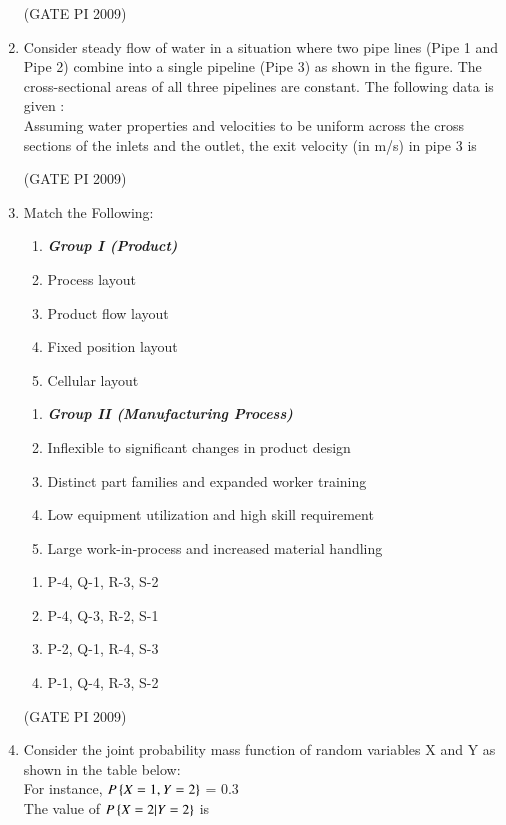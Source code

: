 \documentclass[journal,12pt,onecolumn]{IEEEtran}
\theoremstyle{remark}
\begin{document}
\begin{enumerate}
\hfill (GATE PI 2009)
\item Consider steady flow of water in a situation where two pipe lines (Pipe 1 and Pipe 2) combine into a single pipeline (Pipe 3) as shown in the figure. The cross-sectional areas of all three pipelines are constant. The following data is given : \\
$$$$
Assuming water properties and velocities to be uniform across the cross sections of the inlets and the outlet, the exit velocity (in m/s) in pipe 3 is
\begin{enumerate}
\end{enumerate}
\hfill (GATE PI 2009)

\item Match the Following:
{
\setlength{\columnsep}{-5cm}
\begin{multicols}{2}
\begin{enumerate}[label=\Alph*.]
    \item[]  \textit{\textbf{Group I (Product)}}
    \item Process layout
    \item Product flow layout
    \item Fixed position layout
    \item Cellular layout 
\end{enumerate}
\columnbreak
\begin{enumerate}[label=\arabic*.]
    \item[] \textit{\textbf{Group II (Manufacturing Process)}}
    \item Inflexible to significant changes in product design
    \item Distinct part families and expanded worker training
    \item Low equipment utilization and high skill requirement
    \item Large work-in-process and increased material handling
\end{enumerate}
\end{multicols}
}
\begin{multicols}{2}
\begin{enumerate}
    \item P-4, Q-1, R-3, S-2
    \item P-4, Q-3, R-2, S-1
    \item P-2, Q-1, R-4, S-3
    \item P-1, Q-4, R-3, S-2
\end{enumerate}
\end{multicols}
\hfill (GATE PI 2009)
\item Consider the joint probability mass function of random variables X and Y as shown in the table below: \\
For instance, $P\cbrak{X=1, Y=2}$ = 0.3
$$

$$
The value of $P\cbrak{X=2|Y=2}$ is


\end{enumerate}
\end{document}
